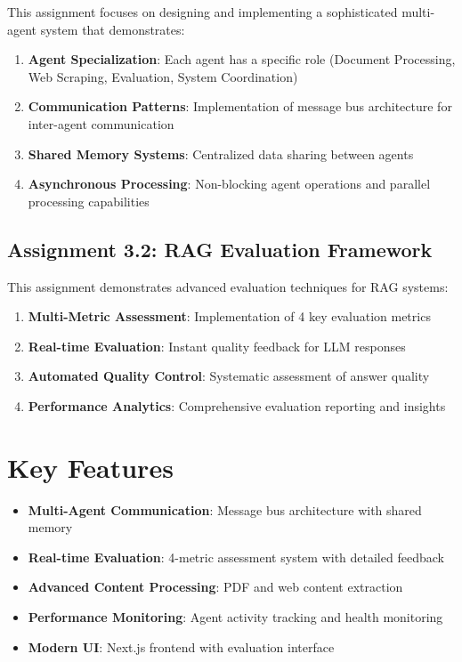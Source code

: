 \documentclass[12pt,a4paper]{article}
\newcommand{\feature}[2]{\textcolor{primaryblue}{\textbf{#1}}: #2}
\begin{document}
This assignment focuses on designing and implementing a sophisticated multi-agent system that demonstrates:

\begin{enumerate}
    \item \textbf{Agent Specialization}: Each agent has a specific role (Document Processing, Web Scraping, Evaluation, System Coordination)
    \item \textbf{Communication Patterns}: Implementation of message bus architecture for inter-agent communication
    \item \textbf{Shared Memory Systems}: Centralized data sharing between agents
    \item \textbf{Asynchronous Processing}: Non-blocking agent operations and parallel processing capabilities
\end{enumerate}

\subsection{Assignment 3.2: RAG Evaluation Framework}

This assignment demonstrates advanced evaluation techniques for RAG systems:

\begin{enumerate}
    \item \textbf{Multi-Metric Assessment}: Implementation of 4 key evaluation metrics
    \item \textbf{Real-time Evaluation}: Instant quality feedback for LLM responses
    \item \textbf{Automated Quality Control}: Systematic assessment of answer quality
    \item \textbf{Performance Analytics}: Comprehensive evaluation reporting and insights
\end{enumerate}

\section{Key Features}

\begin{itemize}[leftmargin=0.5cm]
    \item \feature{Multi-Agent Communication}{Message bus architecture with shared memory}
    \item \feature{Real-time Evaluation}{4-metric assessment system with detailed feedback}
    \item \feature{Advanced Content Processing}{PDF and web content extraction}
    \item \feature{Performance Monitoring}{Agent activity tracking and health monitoring}
    \item \feature{Modern UI}{Next.js frontend with evaluation interface}
\end{itemize}
\end{document}
